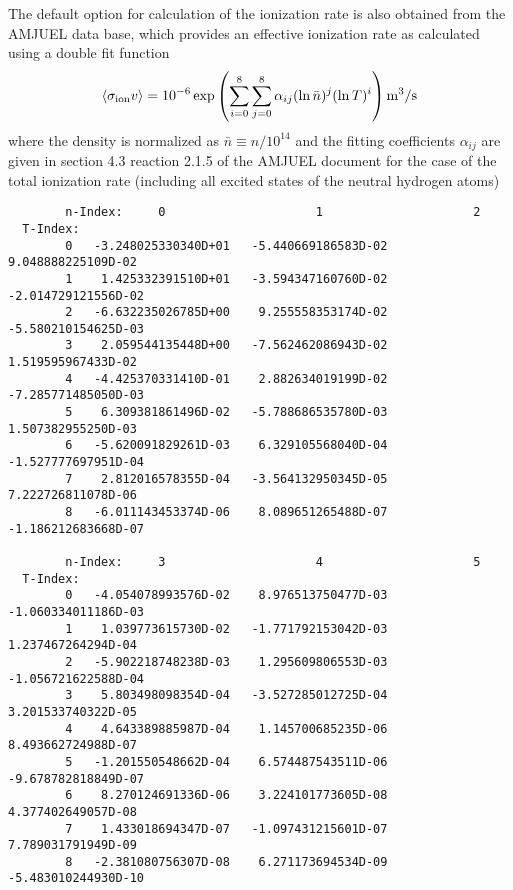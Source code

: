\documentclass[amsmath,amssymb,a4]{revtex4-2}
\begin{document}
The default option for calculation of the ionization rate is also obtained from the AMJUEL data base, which provides an effective ionization rate as calculated using a double fit function
\begin{equation}\label{ionization_AMJUEL}
    \langle\sigma_{\rm ion} v\rangle = 10^{-6} \exp\left( \sum_{i=0}^8\sum_{j=0}^8 \alpha_{ij} (\ln \bar n)^j (\ln T)^i \right)  {\rm m}^3/{\rm s}
\end{equation}
where the density is normalized as $\bar n \equiv n / 10^{14}$ and the fitting coefficients $\alpha_{ij}$ are given in section 4.3 reaction 2.1.5 of the AMJUEL document for the case of the total ionization rate (including all excited states of the neutral hydrogen atoms)
\begin{small}\begin{verbatim}
        n-Index:     0                     1                     2
  T-Index:
        0   -3.248025330340D+01   -5.440669186583D-02    9.048888225109D-02
        1    1.425332391510D+01   -3.594347160760D-02   -2.014729121556D-02
        2   -6.632235026785D+00    9.255558353174D-02   -5.580210154625D-03
        3    2.059544135448D+00   -7.562462086943D-02    1.519595967433D-02
        4   -4.425370331410D-01    2.882634019199D-02   -7.285771485050D-03
        5    6.309381861496D-02   -5.788686535780D-03    1.507382955250D-03
        6   -5.620091829261D-03    6.329105568040D-04   -1.527777697951D-04
        7    2.812016578355D-04   -3.564132950345D-05    7.222726811078D-06
        8   -6.011143453374D-06    8.089651265488D-07   -1.186212683668D-07

        n-Index:     3                     4                     5
  T-Index:
        0   -4.054078993576D-02    8.976513750477D-03   -1.060334011186D-03
        1    1.039773615730D-02   -1.771792153042D-03    1.237467264294D-04
        2   -5.902218748238D-03    1.295609806553D-03   -1.056721622588D-04
        3    5.803498098354D-04   -3.527285012725D-04    3.201533740322D-05
        4    4.643389885987D-04    1.145700685235D-06    8.493662724988D-07
        5   -1.201550548662D-04    6.574487543511D-06   -9.678782818849D-07
        6    8.270124691336D-06    3.224101773605D-08    4.377402649057D-08
        7    1.433018694347D-07   -1.097431215601D-07    7.789031791949D-09
        8   -2.381080756307D-08    6.271173694534D-09   -5.483010244930D-10


\end{verbatim}
\end{small}
\end{document}
